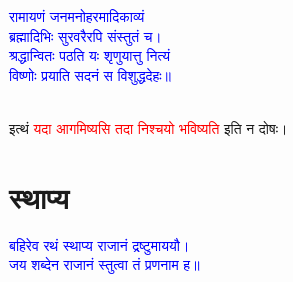 \centering\textcolor{blue}{रामायणं जनमनोहरमादिकाव्यं\nopagebreak\\
ब्रह्मादिभिः सुरवरैरपि संस्तुतं च।\nopagebreak\\
श्रद्धान्वितः पठति यः शृणुयात्तु नित्यं\nopagebreak\\
विष्णोः प्रयाति सदनं स विशुद्धदेहः॥}\nopagebreak\\
\\
\begin{sloppypar}\justifying\noindent इत्थं \textcolor{red}{यदा आगमिष्यसि तदा निश्चयो भविष्यति} इति न दोषः।\end{sloppypar}
\section[स्थाप्य]{स्थाप्य}
\label{sec:sthapya}
\centering\textcolor{blue}{बहिरेव रथं स्थाप्य राजानं द्रष्टुमाययौ।\nopagebreak\\
जय शब्देन राजानं स्तुत्वा तं प्रणनाम ह॥}\nopagebreak\\
\\
